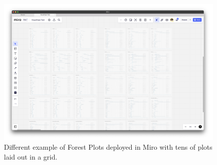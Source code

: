 \begin{figure}[ht]
  \centering
  \includegraphics[width=\textwidth]{media/fig18.png}
  \caption{Different example of Forest Plots deployed in Miro with tens
  of plots laid out in a grid.}
  \label{fig:forest_miro2}
\end{figure}
